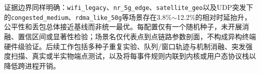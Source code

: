 \documentclass[10pt,twocolumn]{article}
\begin{document}
证据边界同样明确：\texttt{wifi\_legacy}、\texttt{nr\_5g\_edge}、\texttt{satellite\_geo}以及UDP突发下的\texttt{congested\_medium}、\texttt{rdma\_like\_50g}等场景存在3.8\%$\sim$12.2\%的相对时延抬升，公平性和丢包总体接近基线而非统一最优。每配置仅有一个随机种子，未开展消融、置信区间或显著性检验；场景名仅代表点到点链路参数剖面，不构成异构终端硬件级验证。后续工作包括多种子重复实验、队列/窗口轨迹与机制消融、突发强度扫描、真实或半实物端点测试，以及将每事件规则内联到内核或用户态协议栈以降低跨进程开销。



\end{document}
